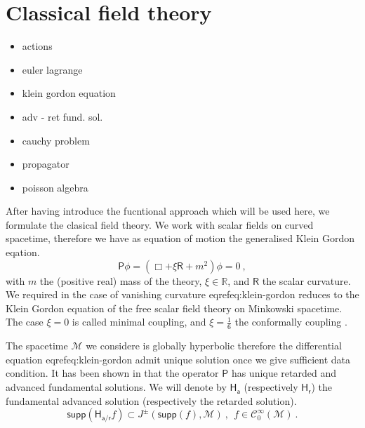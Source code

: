 \documentclass[11pt]{book}
\newcommand{\supp}{\mathsf{supp}}
\newcommand{\Ccal}{\mathcal{C}}
\newcommand{\Mcal}{\mathcal{M}}
\newcommand{\Rbb}{\mathbb{R}}
\newcommand{\Hsf}{\mathsf{H}}
\newcommand{\Psf}{\mathsf{P}}
\newcommand{\Rsf}{\mathsf{R}}
\newcommand{\asf}{\mathsf{a}}
\newcommand{\rsf}{\mathsf{r}}
\theoremstyle{break}
\begin{document}
\section{Classical field theory}

\begin{itemize}
\item actions
\item euler lagrange
\item klein gordon equation
\item adv - ret fund. sol.
\item cauchy problem
\item propagator
\item poisson algebra
\end{itemize}

\vspace*{88pt}


After having introduce the fucntional approach which will be used here, we formulate the clasical field theory. We work with scalar fields on curved spacetime, therefore we have as equation of motion the generalised Klein Gordon eqation.%
%
\begin{equation}
\Psf \phi = \left( \Box + \xi \Rsf + m^2 \right) \phi = 0 \ , 
\label{eq:klein-gordon}
\end{equation}
%
with $m$ the (positive real) mass of the theory, $\xi \in \Rbb$, and $\Rsf$ the scalar curvature. We required in the case of vanishing curvature eqref{eq:klein-gordon} reduces to the Klein Gordon equation of the free scalar field theory on Minkowski spacetime. The case $\xi=0$ is called minimal coupling, and $\xi=\frac16$ the conformally coupling \cite[Appendix D]{waldGR}.\par%


\bigskip


The spacetime $\Mcal$ we considere is globally hyperbolic therefore the differential equation eqref{eq:klein-gordon} admit unique solution once we give sufficient data condition. It has been shown in \cite[section 3]{Bar:2007zz} that the operator $\Psf$ has unique retarded and advanced fundamental solutions. We will denote by $\Hsf_\asf$ (respectively $\Hsf_\rsf$) the fundamental advanced solution (respectively the retarded solution). 
%
\begin{equation*}
\supp\left( \Hsf_{\asf/\rsf} f \right) \subset J^{\pm}\left(\supp\left(f\right),\Mcal\right) \ , \ \ f \in \Ccal^\infty_0(\Mcal) \ . 
\end{equation*}
%
\end{document}
